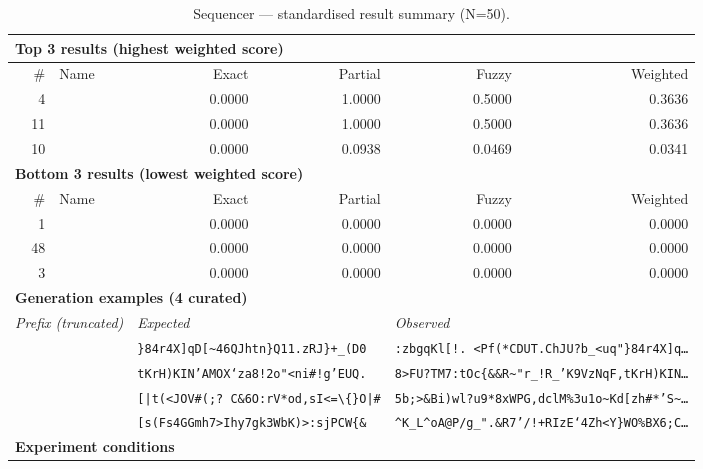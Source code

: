 \begin{table}[htbp]
\centering
\caption{Sequencer — standardised result summary (N=50).}
\label{tab:sequencer_summary}
\begin{adjustbox}{max width=\textwidth}
\begin{tabular}{r p{5cm} r r r r}
\toprule
\multicolumn{6}{l}{\textbf{Top 3 results (highest weighted score)}} \\
\midrule
\# & Name & Exact & Partial & Fuzzy & Weighted \\
\midrule
4 &  & 0.0000 & 1.0000 & 0.5000 & 0.3636 \\
11 &  & 0.0000 & 1.0000 & 0.5000 & 0.3636 \\
10 &  & 0.0000 & 0.0938 & 0.0469 & 0.0341 \\
\midrule
\multicolumn{6}{l}{\textbf{Bottom 3 results (lowest weighted score)}} \\
\midrule
\# & Name & Exact & Partial & Fuzzy & Weighted \\
\midrule
1 &  & 0.0000 & 0.0000 & 0.0000 & 0.0000 \\
48 &  & 0.0000 & 0.0000 & 0.0000 & 0.0000 \\
3 &  & 0.0000 & 0.0000 & 0.0000 & 0.0000 \\
\midrule
\multicolumn{6}{l}{\textbf{Generation examples (4 curated)}} \\
\midrule
\multicolumn{2}{l}{\textit{Prefix (truncated)}} & \multicolumn{2}{l}{\textit{Expected}} & \multicolumn{2}{l}{\textit{Observed}} \\
\midrule
\multicolumn{2}{l}{\texttt{}} & \multicolumn{2}{l}{\texttt{\}84r4X]qD[\textasciitilde{}46QJhtn\}Q11.zRJ\}+\_(D0}} & \multicolumn{2}{l}{\texttt{:zbgqKl[!. <Pf(*CDUT.ChJU?b\_<uq"\}84r4X]q\ldots}} \\
\multicolumn{2}{l}{\texttt{}} & \multicolumn{2}{l}{\texttt{tKrH)KIN'AMOX`za8!2o"<ni\#!g'EUQ.}} & \multicolumn{2}{l}{\texttt{8>FU?TM7:tOc\{\&\&R\textasciitilde{}"r\_!R\_'K9VzNqF,tKrH)KIN\ldots}} \\
\multicolumn{2}{l}{\texttt{}} & \multicolumn{2}{l}{\texttt{[|t(<JOV\#(;? C\&6O:rV*od,sI<=\textbackslash\{\}O|\#}} & \multicolumn{2}{l}{\texttt{5b;>\&Bi)wl?u9*8xWPG,dclM\%3u1o\textasciitilde{}Kd[zh\#*'S\textasciitilde{}\ldots}} \\
\multicolumn{2}{l}{\texttt{}} & \multicolumn{2}{l}{\texttt{[s(Fs4GGmh7>Ihy7gk3WbK)>:sjPCW\{\&}} & \multicolumn{2}{l}{\texttt{\^{}K\_L\^{}oA@P/g\_".\&R7'/!+RIzE`4Zh<Y\}WO\%BX6;C\ldots}} \\
\midrule
\multicolumn{6}{l}{\textbf{Experiment conditions}} \\

\end{tabular}
\end{adjustbox}
\end{table}
